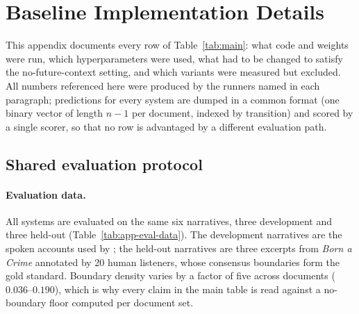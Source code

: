 %

\section{Baseline Implementation Details}
\label{app:baselines}

This appendix documents every row of Table~\ref{tab:main}: what code and weights
were run, which hyperparameters were used, what had to be changed to satisfy the
no-future-context setting, and which variants were measured but excluded.
All numbers referenced here were produced by the runners named in each
paragraph; predictions for every system are dumped in a common format
(one binary vector of length $n-1$ per document, indexed by transition) and
scored by a single scorer, so that no row is advantaged by a different
evaluation path.

\subsection{Shared evaluation protocol}
\label{app:baselines-protocol}

\paragraph{Evaluation data.}
All systems are evaluated on the same six narratives, three development and
three held-out (Table~\ref{tab:app-eval-data}). The development narratives are
the spoken accounts used by \citet{michelmann2025large}; the held-out narratives
are three excerpts from \emph{Born a Crime} annotated by 20 human listeners,
whose consensus boundaries form the gold standard. Boundary density varies by a
factor of five across documents ($0.036$--$0.190$), which is why every claim in
the main table is read against a no-boundary floor computed per document set.

